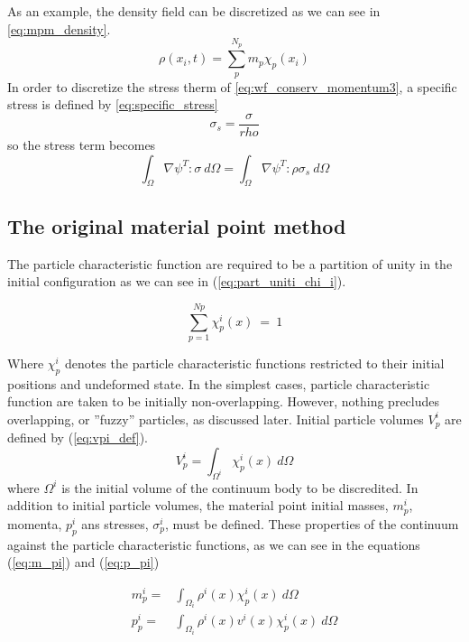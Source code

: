 As an example, the density field can be discretized as we can see in
\eqref{eq:mpm_density}.
\begin{equation}
  \label{eq:mpm_density}
  \rho(x_i,t) =  \sum_p^{N_p}m_p \chi_p(x_i)
\end{equation}
In order to discretize the stress therm of  \eqref{eq:wf_conserv_momentum3}, a specific
stress is defined by \eqref{eq:specific_stress}
\begin{equation}
  \label{eq:specific_stress}
  \sigma_s = \frac{\sigma}{rho}
\end{equation}
so the stress term becomes
\begin{equation}
  \label{eq:specific_stress_intforces}
  \int_{\Omega}  \nabla \psi^T : \sigma\ d\Omega = \int_{\Omega}  \nabla \psi^T : \rho\sigma_s\ d\Omega
\end{equation}

\subsection{The original material point method}
\label{sec:orig-mater-point}

The particle characteristic function are required to be a partition of
unity in the initial configuration as we can see in
(\ref{eq:part_uniti_chi_i}).

\begin{equation}
  \label{eq:part_uniti_chi_i}
  \sum_{p=1}^{Np}\chi_p^i(x)\ =\ 1
\end{equation}

Where $\chi_p^i$ denotes the particle characteristic functions
restricted to their initial positions and undeformed state. In the
simplest cases, particle characteristic function are taken to be
initially non-overlapping. However, nothing precludes overlapping, or
''fuzzy'' particles, as discussed later. Initial particle volumes
$V_p^i$ are defined by (\ref{eq:vpi_def}).
\begin{equation}
  \label{eq:vpi_def}
  V_p^i = \int_{\Omega^i}\chi^i_p(x)\ d\Omega
\end{equation}
where $\Omega^i$ is the initial volume of the continuum body to be
discredited. In addition to initial particle volumes, the material
point initial masses, $m_p^i$, momenta, $p_p^i$ ans stresses,
$\sigma_p^i$, must be defined. These properties of the continuum
against the particle characteristic functions, as we can see in the
equations (\ref{eq:m_pi}) and (\ref{eq:p_pi})

\begin{align}
  \label{eq:m_pi}
  m_p^i =& \int_{\Omega_i}\rho^i(x)\chi_p^i(x)\ d\Omega \\
  \label{eq:p_pi}
  p_p^i =& \int_{\Omega_i}\rho^i(x)v^i(x)\chi_p^i(x)\ d\Omega
\end{align}

